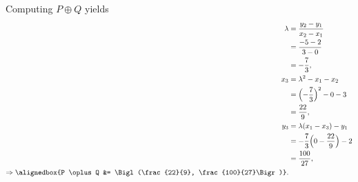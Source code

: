 \documentclass[
  coursecode={MTHE 418},
  assignmentname={Homework \homeworknumber},
  studentnumber=20053722,
  name={Bryan Hoang},
  draft,
]{
  ltxanswer%
}
\begin{document}
  \begin{questions}
    \setcounter{question}{\questionnumber}
    \addtocounter{question}{-1}
    \question[10]\
    \begin{parts}
      \part{}
      \begin{solution}
        Computing \(P \oplus Q\) yields
        \begin{align*}
          \lambda                            &= \frac{y_{2} - y_{1}}{x_{2} - x_{1}}           \\
                                             &= \frac{-5 - 2}{3 - 0}                          \\
                                             &= -\frac{7}{3},                                 \\
          x_{3}                              &= \lambda^{2} - x_{1} - x_{2}                   \\
                                             &= \Bigl(-\frac{7}{3}\Bigr)^{2} - 0 - 3          \\
                                             &= \frac{22}{9},                                 \\
          y_{3}                              &= \lambda(x_{1} - x_{3}) - y_{1}                \\
                                             &= -\frac{7}{3} \Bigl(0 - \frac{22}{9}\Bigr) - 2 \\
                                             &= \frac{100}{27},                               \\
          \Rightarrow \alignedbox{P \oplus Q &= \Bigl(\frac{22}{9}, \frac{100}{27}\Bigr)}.
        \end{align*}
      \end{solution}


\end{parts}
\end{questions}
\end{document}

